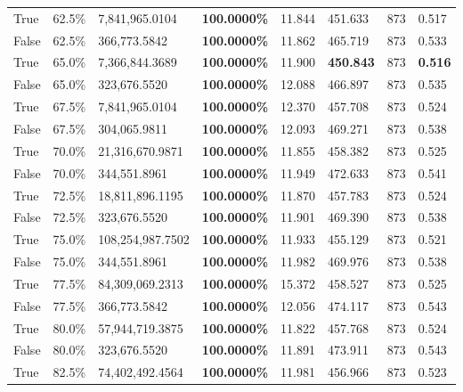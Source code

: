 \begin{table}[H]
{\begin{tabular}{lllrllll}
\cline{1-8}
True & 62.5\% & 7,841,965.0104 & \bfseries \color{red} 100.0000\% & 11.844 & 451.633 & 873 & 0.517 \\
\cline{1-8}
False & 62.5\% & 366,773.5842 & \bfseries \color{red} 100.0000\% & 11.862 & 465.719 & 873 & 0.533 \\
\cline{1-8}
True & 65.0\% & 7,366,844.3689 & \bfseries \color{red} 100.0000\% & 11.900 & \bfseries \color{red} 450.843 & 873 & \bfseries \color{red} 0.516 \\
\cline{1-8}
False & 65.0\% & 323,676.5520 & \bfseries \color{red} 100.0000\% & 12.088 & 466.897 & 873 & 0.535 \\
\cline{1-8}
True & 67.5\% & 7,841,965.0104 & \bfseries \color{red} 100.0000\% & 12.370 & 457.708 & 873 & 0.524 \\
\cline{1-8}
False & 67.5\% & 304,065.9811 & \bfseries \color{red} 100.0000\% & 12.093 & 469.271 & 873 & 0.538 \\
\cline{1-8}
True & 70.0\% & 21,316,670.9871 & \bfseries \color{red} 100.0000\% & 11.855 & 458.382 & 873 & 0.525 \\
\cline{1-8}
False & 70.0\% & 344,551.8961 & \bfseries \color{red} 100.0000\% & 11.949 & 472.633 & 873 & 0.541 \\
\cline{1-8}
True & 72.5\% & 18,811,896.1195 & \bfseries \color{red} 100.0000\% & 11.870 & 457.783 & 873 & 0.524 \\
\cline{1-8}
False & 72.5\% & 323,676.5520 & \bfseries \color{red} 100.0000\% & 11.901 & 469.390 & 873 & 0.538 \\
\cline{1-8}
True & 75.0\% & 108,254,987.7502 & \bfseries \color{red} 100.0000\% & 11.933 & 455.129 & 873 & 0.521 \\
\cline{1-8}
False & 75.0\% & 344,551.8961 & \bfseries \color{red} 100.0000\% & 11.982 & 469.976 & 873 & 0.538 \\
\cline{1-8}
True & 77.5\% & 84,309,069.2313 & \bfseries \color{red} 100.0000\% & 15.372 & 458.527 & 873 & 0.525 \\
\cline{1-8}
False & 77.5\% & 366,773.5842 & \bfseries \color{red} 100.0000\% & 12.056 & 474.117 & 873 & 0.543 \\
\cline{1-8}
True & 80.0\% & 57,944,719.3875 & \bfseries \color{red} 100.0000\% & 11.822 & 457.768 & 873 & 0.524 \\
\cline{1-8}
False & 80.0\% & 323,676.5520 & \bfseries \color{red} 100.0000\% & 11.891 & 473.911 & 873 & 0.543 \\
\cline{1-8}
True & 82.5\% & 74,402,492.4564 & \bfseries \color{red} 100.0000\% & 11.981 & 456.966 & 873 & 0.523 \\

\end{tabular}}
\end{table}
